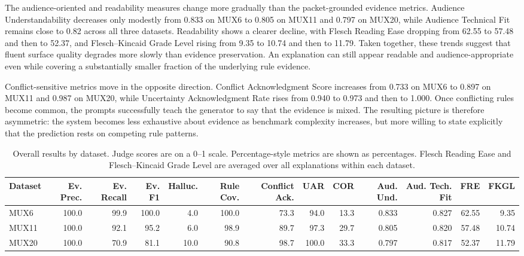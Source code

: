 \documentclass[sigconf,nonacm]{acmart}
\begin{document}
The audience-oriented and readability measures change more gradually than the packet-grounded evidence metrics. Audience Understandability decreases only modestly from 0.833 on MUX6 to 0.805 on MUX11 and 0.797 on MUX20, while Audience Technical Fit remains close to 0.82 across all three datasets. Readability shows a clearer decline, with Flesch Reading Ease dropping from 62.55 to 57.48 and then to 52.37, and Flesch--Kincaid Grade Level rising from 9.35 to 10.74 and then to 11.79. Taken together, these trends suggest that fluent surface quality degrades more slowly than evidence preservation. An explanation can still appear readable and audience-appropriate even while covering a substantially smaller fraction of the underlying rule evidence.

Conflict-sensitive metrics move in the opposite direction. Conflict Acknowledgment Score increases from 0.733 on MUX6 to 0.897 on MUX11 and 0.987 on MUX20, while Uncertainty Acknowledgment Rate rises from 0.940 to 0.973 and then to 1.000. Once conflicting rules become common, the prompts successfully teach the generator to say that the evidence is mixed. The resulting picture is therefore asymmetric: the system becomes less exhaustive about evidence as benchmark complexity increases, but more willing to state explicitly that the prediction rests on competing rule patterns.

\begin{table}[t]
\caption{Overall results by dataset. Judge scores are on a 0--1 scale. Percentage-style metrics are shown as percentages. Flesch Reading Ease and Flesch--Kincaid Grade Level are averaged over all explanations within each dataset.}
\label{tab:dataset-results}
\centering
\small
\begin{tabular}{lrrrrrrrrrrrr}
\toprule
\textbf{Dataset} & \textbf{Ev. Prec.} & \textbf{Ev. Recall} & \textbf{Ev. F1} & \textbf{Halluc.} & \textbf{Rule Cov.} & \textbf{Conflict Ack.} & \textbf{UAR} & \textbf{COR} & \textbf{Aud. Und.} & \textbf{Aud. Tech. Fit} & \textbf{FRE} & \textbf{FKGL} \\
\midrule
MUX6  & 100.0 & 99.9 & 100.0 & 4.0 & 100.0 & 73.3 & 94.0 & 13.3 & 0.833 & 0.827 & 62.55 & 9.35 \\
MUX11 & 100.0 & 92.1 & 95.2  & 6.0 & 98.9  & 89.7 & 97.3 & 29.7 & 0.805 & 0.820 & 57.48 & 10.74 \\
MUX20 & 100.0 & 70.9 & 81.1  & 10.0 & 90.8 & 98.7 & 100.0 & 33.3 & 0.797 & 0.817 & 52.37 & 11.79 \\
\bottomrule
\end{tabular}
\end{table}
\end{document}
